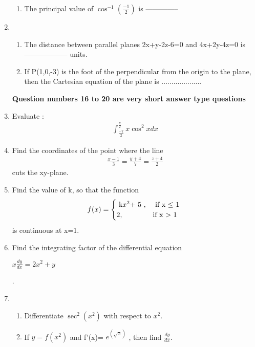 \documentclass[journal,12pt,twocolumn]{IEEEtran}
\renewcommand\thesection{\arabic{section}}
\begin{document}
\begin{enumerate}[label=\thesection.\arabic*.,ref=\thesection.\theenumi]
\begin{enumerate}
\item The principal value of $\cos^{-1} \left(\frac{-1}{2}\right)$ is --------------\\
\end{enumerate}

\item  \begin{enumerate} \item The distance between parallel planes 2x+y-2z-6=0 and 4x+2y-4z=0 is ------------------ units.

\item If P(1,0,-3) is the foot of the perpendicular from the origin to the plane, then the Cartesian equation of the plane is .................... \\
\end{enumerate}
    
\textbf{Question numbers 16 to 20 are very short answer type questions}\\  
\item  Evaluate :
	\begin{align}
         \int_{\frac{-\pi}{2}}^{\frac{\pi}{2}} x \cos^2 x dx \nonumber
	\end{align}  

\item  Find the coordinates of the point where the line 
        \begin{align}
        \frac{x-1}{3} = \frac{y+4}{7} = \frac{z+4}{2}
        \nonumber
	\end{align} 
        cuts the xy-plane. \\

\item  Find the value of k, so that the function \begin{equation*}  f(x)  = \begin{cases}
                $ k$ x^2 $+ 5 $ ,  &\text{ if  x $\leq$ 1 } \\
        2 , &\text{if x $ > $ 1}
\end{cases} \end{equation*}  is continuous at x=1. \\
\item  Find the integrating factor of the differential equation \begin{center} $ x\frac{dy}{dx} = 2x^2 +y $ \end{center} .
\item \begin{enumerate} \item Differentiate $ \sec^2(x^2) $ with respect to $ x^2 $.
 \item If $y=f(x^2)$  and  f'(x)= $ e^{\left(\sqrt{x}\right)}$  , then find $\frac{dy}{dx}$.\\
\end{enumerate}

\end{enumerate}
\end{document}
